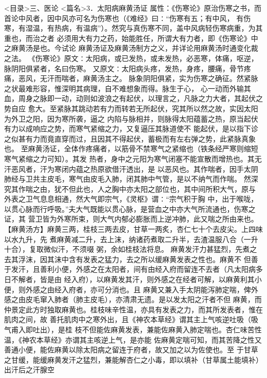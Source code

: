 \documentclass[a4paper,12pt,UTF8,twoside]{ctexbook}
\begin{document}
<目录>三、医论
<篇名>3．太阳病麻黄汤证
属性：《伤寒论》原治伤寒之书，而首论中风者，因中风亦可名为伤寒也（《难经》曰∶“伤寒有五；有中风， 
有伤寒，有湿温，有热病，有温病”）。然究与真伤寒不同，盖中风病轻伤寒病重，为其重也，而治之者 
必须用大有力之药，始能胜任，所谓大有力者，即《伤寒论》中之麻黄汤是也。今试论 
麻黄汤证及麻黄汤制方之义，并详论用麻黄汤时通变化裁之法。 
《伤寒论》原文∶太阳病，或已发热，或未发热，必恶寒，体痛，呕逆，脉阴阳俱紧者，名曰伤寒。 
又原文∶太阳病头疼，发热，身疼，腰痛，骨节疼痛，恶风，无汗而喘者，麻黄汤主之。 
脉象阴阳俱紧，实为伤寒之确征。然紧脉之状最难形容，惟深明其病理，自不难想象而得。脉生于心， 
心一动而外输其血，周身之脉即一动，动则如波浪之有起伏，以理言之，凡脉之力大者，其起伏之势自应 
愈大。至紧脉其跳动若有力而转若无所起伏，究其所以然之故，实因太阳为外卫之阳，因为寒所袭，逼之 
内陷与脉相并，则脉得太阳蕴蓄之热，原当起伏有力以成响应之势，而寒气紧缩之力，又复逼压其脉道使不 
能起伏，是以指下诊之似甚有力而竟直穿而过，且因其不得起伏，蓄极而有左右弹之势，此紧脉真象也。 
至麻黄汤证，全体作疼痛者，以筋骨不禁寒气之紧缩也（铁条经严寒则缩短寒气紧缩之力可知）。其发 
热者，身中之元阳为寒气闭塞不能宣散而增热也。其无汗恶风者，汗为寒闭内蕴之热原欲借汗透出，是 
以恶风也。其作喘者，因手太阴肺经与卫共主皮毛，寒气由皮毛入肺，闭其肺中气管，是以不纳气而作喘。 
然深究其作喘之由，犹不但此也，人之胸中亦太阳之部位也，其中间所积大气，原与 
外表之卫气息息相通，然大气即宗气，《灵枢》谓∶“宗气积于胸 
中，出于喉咙，以贯心脉而行呼吸。”夫大气既能以贯心脉，是营血之中亦大气所流通也，伤寒之证，其 
营卫皆为外寒所束，则大气内郁必膨胀而上逆冲肺，此又喘之所由来也。 
【麻黄汤方】麻黄三两，桂枝三两去皮，甘草一两炙，杏仁七十个去皮尖。上四味以水九升，先 
煮麻黄减二升，去上沫，纳诸药煮取二升半，去渣温服八合（一升十合），复取微似汗，不须啜 
粥，余如桂枝法将息。 
麻黄发汗力甚猛烈，先煮之去其浮沫，因其沫中含有发表之猛力，去之所以缓麻黄发表之性也。麻黄不 
但善于发汗，且善利小便，外感之在太阳者，间有由经入府而留连不去者（凡太阳病多日不解者，皆是由 
经入府），以麻黄发其汗，则外感之在经者可解，以麻黄利其小便，则外感之由经入府者，亦可分消也。且 
麻黄又兼入手太阴能泻肺定喘，俾外感之由皮毛窜入肺者（肺主皮毛），亦清肃无遗。是以发太阳之汗者不但 
麻黄，而仲景定此方时独取麻黄也。桂枝味辛性温，亦具有发表之力，而其所发表者，惟在肌肉之间，故 
善托肌肉中之寒外出，且《神农本草经》谓其主上气咳逆吐吸（吸气甫入即吐出），是桂 
枝不但能佐麻黄发表，兼能佐麻黄入肺定喘也。杏仁味苦性温，《神农本草经》亦谓其主咳逆上气，是亦能 
佐麻黄定喘可知，而其苦降之性又善通小便，能佐麻黄以除太阳病之留连于府者，故又加之以为佐使也。至 
于甘草之甘缓，能缓麻黄发汗之猛烈，兼能解杏仁之小毒，即以填补（甘草属土能填补）出汗后之汗腺空 
\end{document}
